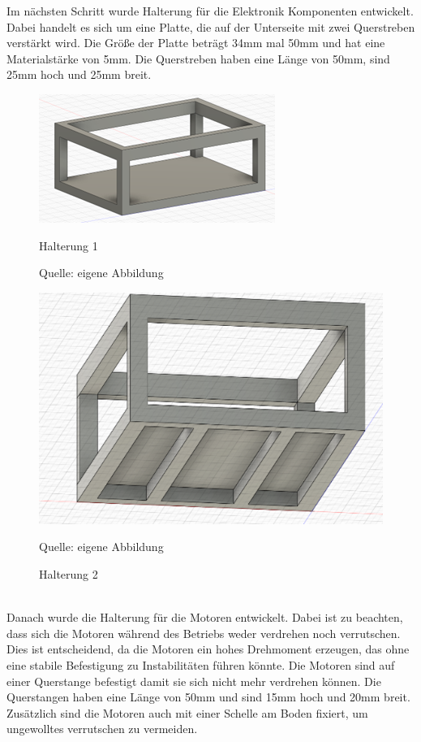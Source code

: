 \documentclass[ngerman,12pt,a4paper]{article}
\begin{document}
		Im nächsten Schritt wurde Halterung für die Elektronik Komponenten entwickelt. Dabei handelt es sich um eine Platte, die auf der Unterseite mit zwei Querstreben verstärkt wird. Die Größe der Platte beträgt 34mm mal 50mm und hat eine Materialstärke von 5mm. Die Querstreben haben eine Länge von 50mm, sind 25mm hoch und 25mm breit. \\
		\begin{figure}[h]
			\begin{minipage}{0.3\linewidth}
				\centering
				\includegraphics{Pictures/Halterung-1}
				\caption{Halterung 1}
				\label{fig:Halterung}
				\small Quelle: eigene Abbildung
			\end{minipage}
			\hspace{0.25\linewidth}
			\begin{minipage}{0.3\linewidth}
				\centering
				\includegraphics{Pictures/Halterung-2}
				\caption{Halterung 2}
				\label{fig:Halterung}
				\small Quelle: eigene Abbildung
			\end{minipage}
		\end{figure} \\
		Danach wurde die Halterung für die Motoren entwickelt. Dabei ist zu beachten, dass sich die Motoren während des Betriebs weder verdrehen noch verrutschen. Dies ist entscheidend, da die Motoren ein hohes Drehmoment erzeugen, das ohne eine stabile Befestigung zu Instabilitäten führen könnte. Die Motoren sind auf einer Querstange befestigt damit sie sich nicht mehr verdrehen können. Die Querstangen haben eine Länge von 50mm und sind 15mm hoch und 20mm breit. Zusätzlich sind die Motoren auch mit einer Schelle am Boden fixiert, um ungewolltes verrutschen zu vermeiden. \\
\end{document}
